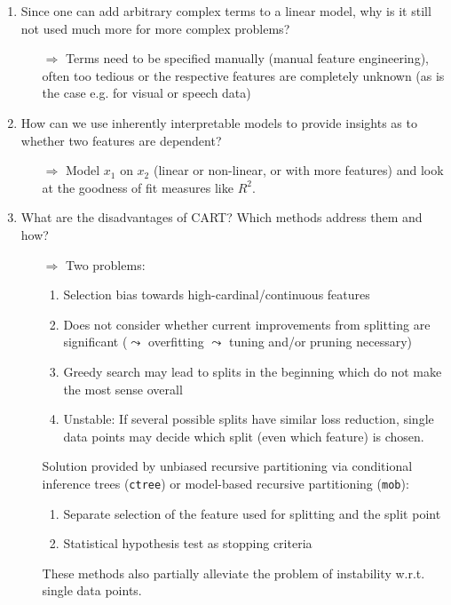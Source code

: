 \begin{enumerate}
        \item Since one can add arbitrary complex terms to a linear model, why is it still not used much more for more complex problems?
        \begin{itemize}
            \item[$\Rightarrow$] Terms need to be specified manually (manual feature engineering), often too tedious or the respective features are completely unknown (as is the case e.g. for visual or speech data)
        \end{itemize}
    	\item How can we use inherently interpretable models to provide insights as to whether two features are dependent?
    	\begin{itemize}
    		\item[$\Rightarrow$] Model $x_1$ on $x_2$ (linear or non-linear, or with more features) and look at the goodness of fit measures like $R^2$.
    	\end{itemize}
        
    	\item What are the disadvantages of CART? Which methods address them and how?
    	\begin{itemize}
    		\item[$\Rightarrow$] Two problems:
    		\begin{enumerate}[1.]
    			\item Selection bias towards high-cardinal/continuous features 
    			\item Does not consider whether current improvements from splitting are significant ($\leadsto$ overfitting $\leadsto$ tuning and/or pruning necessary)
                \item Greedy search may lead to splits in the beginning which do not make the most sense overall
                \item Unstable: If several possible splits have similar loss reduction, single data points may decide which split (even which feature) is chosen.
    		\end{enumerate}
    		Solution provided by unbiased recursive partitioning via conditional inference trees (\texttt{ctree}) or model-based recursive partitioning (\texttt{mob}): 
            \begin{enumerate}[1.]
                \item Separate selection of the feature used for splitting and the split point
                \item Statistical hypothesis test as stopping criteria
            \end{enumerate}
            These methods also partially alleviate the problem of instability w.r.t. single data points.

    	\end{itemize}
	\end{enumerate}